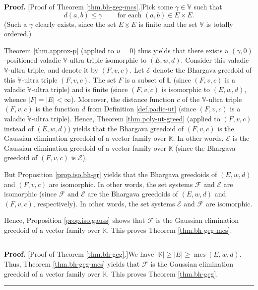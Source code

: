 \documentclass[numbers=enddot,12pt,final,onecolumn,notitlepage]{scrartcl}%
\theoremstyle{definition}
\newenvironment{proof}[1][Proof]{\noindent\textbf{#1.} }{\ \rule{0.5em}{0.5em}}
\newcommand{\timesu}{\mathbin{\underline{\times}}}
\renewcommand{\leq}{\leqslant}
\renewcommand{\geq}{\geqslant}
\theoremstyle{plainsl}
\begin{document}
\begin{proof}
[Proof of Theorem \ref{thm.bh-geg-mcs}.]Pick some $\gamma\in\mathbb{V}$ such
that%
\[
d\left(  a,b\right)  \leq\gamma\ \ \ \ \ \ \ \ \ \ \text{for each }\left(
a,b\right)  \in E\timesu E.
\]
(Such a $\gamma$ clearly exists, since the set $E\timesu E$ is finite and the
set $\mathbb{V}$ is totally ordered.)

Theorem \ref{thm.approx-p} (applied to $u=0$) thus yields that there exists a
$\left(  \gamma,0\right)  $-positioned valadic $\mathbb{V}$-ultra triple
isomorphic to $\left(  E,w,d\right)  $. Consider this valadic $\mathbb{V}%
$-ultra triple, and denote it by $\left(  F,v,c\right)  $. Let $\mathcal{E}$
denote the Bhargava greedoid of this $\mathbb{V}$-ultra triple $\left(
F,v,c\right)  $. The set $F$ is a subset of $\mathbb{L}$ (since $\left(
F,v,c\right)  $ is a valadic $\mathbb{V}$-ultra triple) and is finite (since
$\left(  F,v,c\right)  $ is isomorphic to $\left(  E,w,d\right)  $, whence
$\left\vert F\right\vert =\left\vert E\right\vert <\infty$). Moreover, the
distance function $c$ of the $\mathbb{V}$-ultra triple $\left(  F,v,c\right)
$ is the function $d$ from Definition \ref{def.padic-ut} (since $\left(
F,v,c\right)  $ is a valadic $\mathbb{V}$-ultra triple). Hence, Theorem
\ref{thm.poly-ut-greed} (applied to $\left(  F,v,c\right)  $ instead of
$\left(  E,w,d\right)  $) yields that the Bhargava greedoid of $\left(
F,v,c\right)  $ is the Gaussian elimination greedoid of a vector family over
$\mathbb{K}$. In other words, $\mathcal{E}$ is the Gaussian elimination
greedoid of a vector family over $\mathbb{K}$ (since the Bhargava greedoid of
$\left(  F,v,c\right)  $ is $\mathcal{E}$).

But Proposition \ref{prop.iso.bh-gr} yields that the Bhargava greedoids of
$\left(  E,w,d\right)  $ and $\left(  F,v,c\right)  $ are isomorphic. In other
words, the set systems $\mathcal{F}$ and $\mathcal{E}$ are isomorphic (since
$\mathcal{F}$ and $\mathcal{E}$ are the Bhargava greedoids of $\left(
E,w,d\right)  $ and $\left(  F,v,c\right)  $, respectively). In other words,
the set systems $\mathcal{E}$ and $\mathcal{F}$ are isomorphic.

Hence, Proposition \ref{prop.iso.gauss} shows that $\mathcal{F}$ is the
Gaussian elimination greedoid of a vector family over $\mathbb{K}$. This
proves Theorem \ref{thm.bh-geg-mcs}.
\end{proof}

\begin{proof}
[Proof of Theorem \ref{thm.bh-geg}.]We have $\left\vert \mathbb{K}\right\vert
\geq\left\vert E\right\vert \geq\operatorname*{mcs}\left(  E,w,d\right)  $.
Thus, Theorem \ref{thm.bh-geg-mcs} yields that $\mathcal{F}$ is the Gaussian
elimination greedoid of a vector family over $\mathbb{K}$. This proves Theorem
\ref{thm.bh-geg}.
\end{proof}
\end{document}
